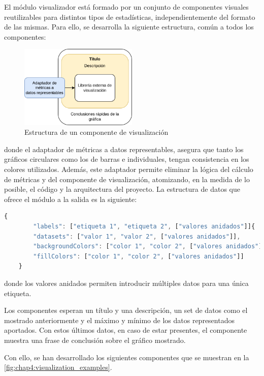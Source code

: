 El módulo visualizador está formado por un conjunto de componentes visuales reutilizables para distintos tipos de estadísticas, independientemente del formato de las mismas. Para ello, se desarrolla la siguiente estructura, común a todos los componentes:

\begin{figure}[H]
	\centering
	\includegraphics[width=0.5\textwidth]{img/visualizadores.png}
	\caption{Estructura de un componente de visualización}
	\label{fig:chap4:visualization}
\end{figure}

donde el adaptador de métricas a datos representables, asegura que tanto los gráficos circulares como los de barras e individuales, tengan consistencia en los colores utilizados. Además, este adaptador permite eliminar la lógica del cálculo de métricas y del componente de visualización, atomizando, en la medida de lo posible, el código y la arquitectura del proyecto. La estructura de datos que ofrece el módulo a la salida es la siguiente:

\begin{lstlisting}[language=JavaScript]
	{
		"labels": ["etiqueta 1", "etiqueta 2", ["valores anidados"]]{
		"datasets": ["valor 1", "valor 2", ["valores anidados"]],
		"backgroundColors": ["color 1", "color 2", ["valores anidados"]],
		"fillColors": ["color 1", "color 2", ["valores anidados"]]
	}
\end{lstlisting}

donde los valores anidados permiten introducir múltiples datos para una única etiqueta.

Los componentes esperan un título y una descripción, un set de datos como el mostrado anteriormente y el máximo y mínimo de los datos representados aportados. Con estos últimos datos, en caso de estar presentes, el componente muestra una frase de conclusión sobre el gráfico mostrado.

Con ello, se han desarrollado los siguientes componentes que se muestran en la \autoref{fig:chap4:visualization_examples}.



